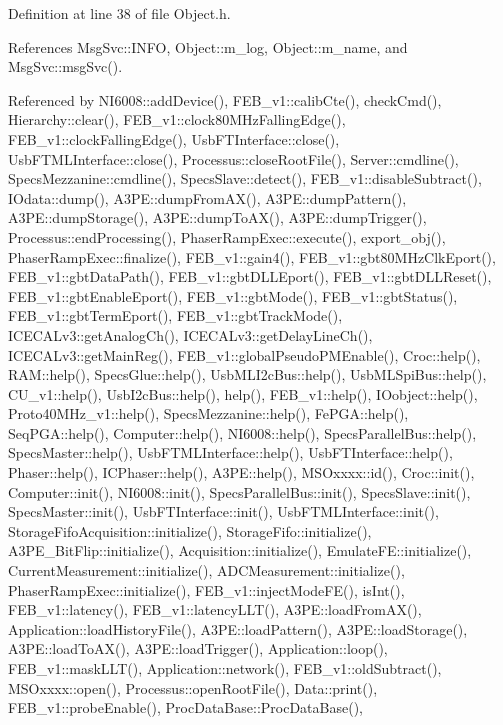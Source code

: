 Definition at line 38 of file Object.\+h.



References Msg\+Svc\+::\+I\+N\+FO, Object\+::m\+\_\+log, Object\+::m\+\_\+name, and Msg\+Svc\+::msg\+Svc().



Referenced by N\+I6008\+::add\+Device(), F\+E\+B\+\_\+v1\+::calib\+Cte(), check\+Cmd(), Hierarchy\+::clear(), F\+E\+B\+\_\+v1\+::clock80\+M\+Hz\+Falling\+Edge(), F\+E\+B\+\_\+v1\+::clock\+Falling\+Edge(), Usb\+F\+T\+Interface\+::close(), Usb\+F\+T\+M\+L\+Interface\+::close(), Processus\+::close\+Root\+File(), Server\+::cmdline(), Specs\+Mezzanine\+::cmdline(), Specs\+Slave\+::detect(), F\+E\+B\+\_\+v1\+::disable\+Subtract(), I\+Odata\+::dump(), A3\+P\+E\+::dump\+From\+A\+X(), A3\+P\+E\+::dump\+Pattern(), A3\+P\+E\+::dump\+Storage(), A3\+P\+E\+::dump\+To\+A\+X(), A3\+P\+E\+::dump\+Trigger(), Processus\+::end\+Processing(), Phaser\+Ramp\+Exec\+::execute(), export\+\_\+obj(), Phaser\+Ramp\+Exec\+::finalize(), F\+E\+B\+\_\+v1\+::gain4(), F\+E\+B\+\_\+v1\+::gbt80\+M\+Hz\+Clk\+Eport(), F\+E\+B\+\_\+v1\+::gbt\+Data\+Path(), F\+E\+B\+\_\+v1\+::gbt\+D\+L\+L\+Eport(), F\+E\+B\+\_\+v1\+::gbt\+D\+L\+L\+Reset(), F\+E\+B\+\_\+v1\+::gbt\+Enable\+Eport(), F\+E\+B\+\_\+v1\+::gbt\+Mode(), F\+E\+B\+\_\+v1\+::gbt\+Status(), F\+E\+B\+\_\+v1\+::gbt\+Term\+Eport(), F\+E\+B\+\_\+v1\+::gbt\+Track\+Mode(), I\+C\+E\+C\+A\+Lv3\+::get\+Analog\+Ch(), I\+C\+E\+C\+A\+Lv3\+::get\+Delay\+Line\+Ch(), I\+C\+E\+C\+A\+Lv3\+::get\+Main\+Reg(), F\+E\+B\+\_\+v1\+::global\+Pseudo\+P\+M\+Enable(), Croc\+::help(), R\+A\+M\+::help(), Specs\+Glue\+::help(), Usb\+M\+L\+I2c\+Bus\+::help(), Usb\+M\+L\+Spi\+Bus\+::help(), C\+U\+\_\+v1\+::help(), Usb\+I2c\+Bus\+::help(), help(), F\+E\+B\+\_\+v1\+::help(), I\+Oobject\+::help(), Proto40\+M\+Hz\+\_\+v1\+::help(), Specs\+Mezzanine\+::help(), Fe\+P\+G\+A\+::help(), Seq\+P\+G\+A\+::help(), Computer\+::help(), N\+I6008\+::help(), Specs\+Parallel\+Bus\+::help(), Specs\+Master\+::help(), Usb\+F\+T\+M\+L\+Interface\+::help(), Usb\+F\+T\+Interface\+::help(), Phaser\+::help(), I\+C\+Phaser\+::help(), A3\+P\+E\+::help(), M\+S\+Oxxxx\+::id(), Croc\+::init(), Computer\+::init(), N\+I6008\+::init(), Specs\+Parallel\+Bus\+::init(), Specs\+Slave\+::init(), Specs\+Master\+::init(), Usb\+F\+T\+Interface\+::init(), Usb\+F\+T\+M\+L\+Interface\+::init(), Storage\+Fifo\+Acquisition\+::initialize(), Storage\+Fifo\+::initialize(), A3\+P\+E\+\_\+\+Bit\+Flip\+::initialize(), Acquisition\+::initialize(), Emulate\+F\+E\+::initialize(), Current\+Measurement\+::initialize(), A\+D\+C\+Measurement\+::initialize(), Phaser\+Ramp\+Exec\+::initialize(), F\+E\+B\+\_\+v1\+::inject\+Mode\+F\+E(), is\+Int(), F\+E\+B\+\_\+v1\+::latency(), F\+E\+B\+\_\+v1\+::latency\+L\+L\+T(), A3\+P\+E\+::load\+From\+A\+X(), Application\+::load\+History\+File(), A3\+P\+E\+::load\+Pattern(), A3\+P\+E\+::load\+Storage(), A3\+P\+E\+::load\+To\+A\+X(), A3\+P\+E\+::load\+Trigger(), Application\+::loop(), F\+E\+B\+\_\+v1\+::mask\+L\+L\+T(), Application\+::network(), F\+E\+B\+\_\+v1\+::old\+Subtract(), M\+S\+Oxxxx\+::open(), Processus\+::open\+Root\+File(), Data\+::print(), F\+E\+B\+\_\+v1\+::probe\+Enable(), Proc\+Data\+Base\+::\+Proc\+Data\+Base(), 